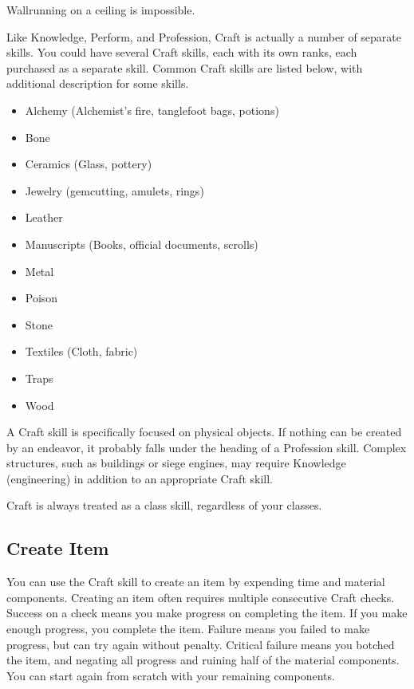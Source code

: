         Wallrunning on a ceiling is impossible.

        Like Knowledge, Perform, and Profession, Craft is actually a number of separate skills. You could have several Craft skills, each with its own ranks, each purchased as a separate skill. Common Craft skills are listed below, with additional description for some skills.

        \begin{itemize}
            \item Alchemy (Alchemist's fire, tanglefoot bags, potions)
            \item Bone
            \item Ceramics (Glass, pottery)
            \item Jewelry (gemcutting, amulets, rings)
            \item Leather
            \item Manuscripts (Books, official documents, scrolls)
            \item Metal
            \item Poison
            \item Stone
            \item Textiles (Cloth, fabric)
            \item Traps
            \item Wood
        \end{itemize}

        A Craft skill is specifically focused on physical objects. If nothing can be created by an endeavor, it probably falls under the heading of a Profession skill. Complex structures, such as buildings or siege engines, may require Knowledge (engineering) in addition to an appropriate Craft skill.

        Craft is always treated as a class skill, regardless of your classes.

    \subsection{Create Item}
        You can use the Craft skill to create an item by expending time and material components. Creating an item often requires multiple consecutive Craft checks. Success on a check means you make progress on completing the item. If you make enough progress, you complete the item. Failure means you failed to make progress, but can try again without penalty. Critical failure means you botched the item, and negating all progress and ruining half of the material components. You can start again from scratch with your remaining components.


